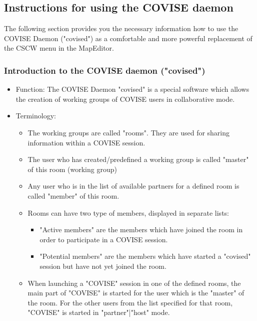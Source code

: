 \clearpage

\subsection{Instructions for using the COVISE daemon}

The following section provides you the necessary information how to use the COVISE Daemon ("covised")
as a comfortable and more powerful replacement of the CSCW menu in the MapEditor.

\subsubsection{Introduction to the COVISE daemon ("covised")}

\begin{itemize}

\item Function: \newline
	The COVISE Daemon "covised" is a special software which allows the creation of
        working groups of COVISE users in collaborative mode.

\item Terminology:
    
    \begin{itemize}
	\item 	The working groups are called "rooms". They are used for
              	sharing information within a COVISE session.
	\item 	The user who has created/predefined a working group is called
              	"master" of this room (working group)
	\item 	Any user who is in the list of available partners for
              	a defined room is called "member" of this room.
 	\item   Rooms can have two type of members, displayed in separate lists:
	
	 	\begin{itemize}
	 		\item 	"Active members" are the members which have joined
                       		the room in order to participate in a COVISE session.
              		\item 	"Potential members" are the members which have started a "covised"
                       		session but have not yet joined the room.	
         	\end{itemize}
		
 	\item 	When launching a "COVISE" session in one of the defined rooms,
          	the main part of "COVISE" is started for the user which is
          	the "master" of the room. For the other users from the list
          	specified for that room,  "COVISE" is started in "partner"|"host"
          	mode.
     \end{itemize}
     
\end{itemize}
     

